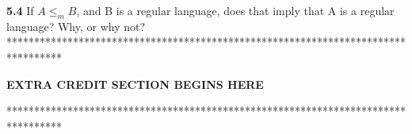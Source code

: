 \documentclass[12pt]{article}
\newcommand\tab[1][1cm]{\hspace*{#1}}
\begin{document}
\textbf{5.4} If $A \le_m B$, and B is a regular language, does that imply that A is
a regular language? Why, or why not? \\




\pagebreak
**********************************************************************************

\tab\tab\tab \textbf{EXTRA CREDIT SECTION BEGINS HERE}

**********************************************************************************
\end{document}
